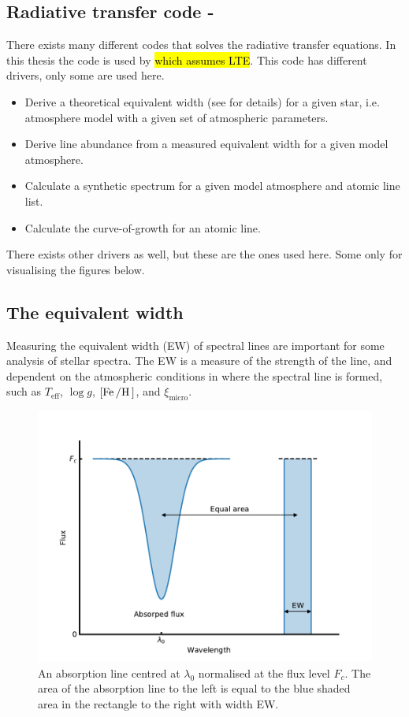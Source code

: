 \subsection{Radiative transfer code - }

There exists many different codes that solves the radiative transfer equations. In this thesis the
 code is used by \citet{Sneden1973} \hl{which assumes LTE}. This code has different
drivers, only some are used here.
\begin{itemize}
  \item Derive a theoretical equivalent width (see  for details) for a given star, i.e.
        atmosphere model with a given set of atmospheric parameters.
  \item Derive line abundance from a measured equivalent width for a given model atmosphere.
  \item Calculate a synthetic spectrum for a given model atmosphere and atomic line list.
  \item Calculate the curve-of-growth for an atomic line.
\end{itemize}
There exists other drivers as well, but these are the ones used here. Some only for visualising the
figures below.



\subsection{The equivalent width}
\label{sec:EW}

Measuring the equivalent width (EW) of spectral lines are important for some analysis of stellar
spectra. The EW is a measure of the strength of the line, and dependent on the atmospheric
conditions in where the spectral line is formed, such as $T_\mathrm{eff}$, $\log g$,
$[\ion{Fe}/\ion{H}]$, and $\xi_\mathrm{micro}$.

\begin{figure}[htpb!]
    \centering
    \includegraphics[width=0.85\linewidth]{figures/ewTheoretical.pdf}
    \caption{An absorption line centred at $\lambda_0$ normalised at the flux level $F_c$. The area
             of the absorption line to the left is equal to the blue shaded area in the rectangle to
             the right with width EW.}
    \label{fig:ewTheoretical}
\end{figure}

